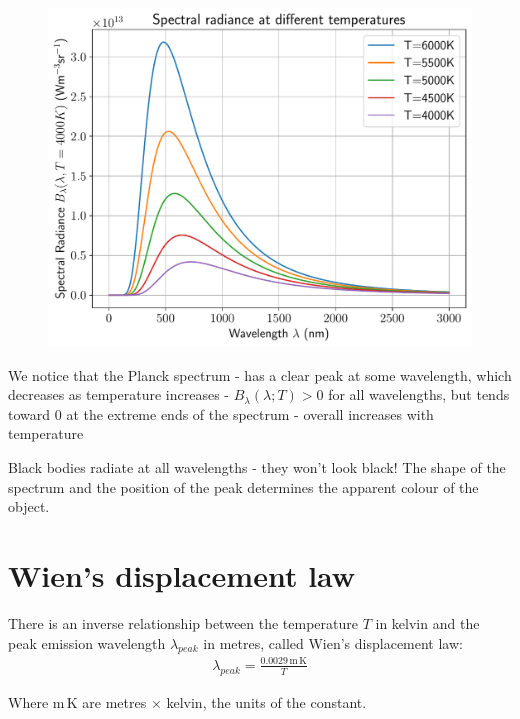 \documentclass[
  letterpaper,
  DIV=11,
  numbers=noendperiod]{scrreprt}
\begin{document}
\begin{figure}[H]

{\centering \includegraphics{SP1.1_-_Stellar_Properties_files/figure-pdf/cell-22-output-1.pdf}

}

\end{figure}

We notice that the Planck spectrum - has a clear peak at some
wavelength, which decreases as temperature increases -
\(B_\lambda(\lambda;T)> 0\) for all wavelengths, but tends toward \(0\)
at the extreme ends of the spectrum - overall increases with temperature

Black bodies radiate at all wavelengths - they won't look black! The
shape of the spectrum and the position of the peak determines the
apparent colour of the object.

\hypertarget{wiens-displacement-law}{%
\section{Wien's displacement law}\label{wiens-displacement-law}}

There is an inverse relationship between the temperature \(T\) in kelvin
and the peak emission wavelength \(\lambda_{peak}\) in metres, called
Wien's displacement law: \begin{align}
\lambda_{peak} = \frac{0.0029\,\mathrm{m\,K}}{T}
\end{align}

Where \(\mathrm{m\,K}\) are metres \(\times\) kelvin, the units of the
constant.
\end{document}
